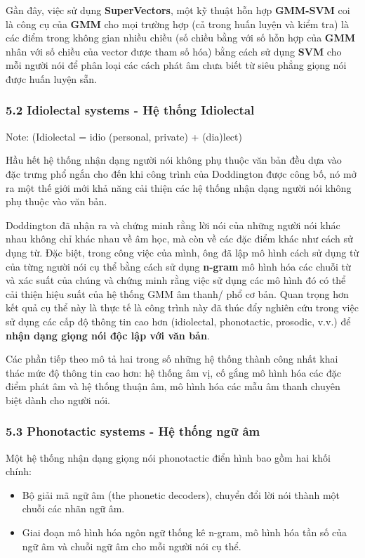 \documentclass{article}
\begin{document}
	Gần đây, việc sử dụng \textbf{SuperVectors}, một kỹ thuật hỗn hợp \textbf{GMM-SVM} coi là công cụ của \textbf{GMM} cho mọi trường hợp (cả trong huấn luyện và kiểm tra) là các điểm trong không gian nhiều chiều (số chiều bằng với số hỗn hợp của \textbf{GMM} nhân với số chiều của vector được tham số hóa) bằng cách sử dụng \textbf{SVM} cho mỗi người nói để phân loại các cách phát âm chưa biết từ siêu phẳng giọng nói được huấn luyện sẵn.
	
	\subsubsection{5.2 Idiolectal systems - Hệ thống Idiolectal}
	\qquad Note: (Idiolectal = idio (personal, private) + (dia)lect)
	
	Hầu hết hệ thống nhận dạng người nói không phụ thuộc văn bản đều dựa vào đặc trưng phổ ngắn cho đến khi công trình của Doddington được công bố, nó mở ra một thế giới mới khả năng cải thiện các hệ thống nhận dạng người nói không phụ thuộc vào văn bản. 
	
	Doddington đã nhận ra và chứng minh rằng lời nói của những người nói khác nhau không chỉ khác nhau về âm học, mà còn về các đặc điểm khác như cách sử dụng từ. Đặc biệt, trong công việc của mình, ông đã lập mô hình cách sử dụng từ của từng người nói cụ thể bằng cách sử dụng \textbf{n-gram} mô hình hóa các chuỗi từ và xác suất của chúng và chứng minh rằng việc sử dụng các mô hình đó có thể cải thiện hiệu suất của hệ thống GMM âm thanh/ phổ cơ bản. Quan trọng hơn kết quả cụ thể này là thực tế là công trình này đã thúc đẩy nghiên cứu trong việc sử dụng các cấp độ thông tin cao hơn (idiolectal, phonotactic, prosodic, v.v.) để \textbf{nhận dạng giọng nói độc lập với văn bản}. 
	
	Các phần tiếp theo mô tả hai trong số những hệ thống thành công nhất khai thác mức độ thông tin cao hơn: hệ thống âm vị, cố gắng mô hình hóa các đặc điểm phát âm và hệ thống thuận âm, mô hình hóa các mẫu âm thanh chuyên biệt dành cho người nói.
	
	\subsubsection{5.3 Phonotactic systems - Hệ thống ngữ âm}
	\qquad Một hệ thống nhận dạng giọng nói phonotactic điển hình bao gồm hai khối chính:
	\begin{itemize}
		\item Bộ giải mã ngữ âm (the phonetic decoders), chuyển đổi lời nói thành một chuỗi các nhãn ngữ âm.
		\item Giai đoạn mô hình hóa ngôn ngữ thống kê n-gram, mô hình hóa tần số của ngữ âm và chuỗi ngữ âm cho mỗi người nói cụ thể.
	\end{itemize}
\end{document}
